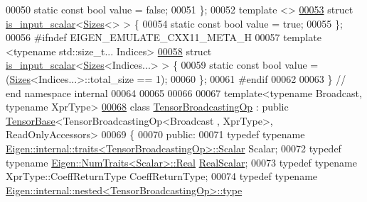 \begin{DoxyCode}
00050   \textcolor{keyword}{static} \textcolor{keyword}{const} \textcolor{keywordtype}{bool} value = \textcolor{keyword}{false};
00051 \};
00052 \textcolor{keyword}{template} <>
\hyperlink{struct_eigen_1_1internal_1_1is__input__scalar_3_01_sizes_3_4_01_4}{00053} \textcolor{keyword}{struct }\hyperlink{struct_eigen_1_1internal_1_1is__input__scalar}{is\_input\_scalar}<\hyperlink{struct_eigen_1_1_sizes}{Sizes}<> > \{
00054   \textcolor{keyword}{static} \textcolor{keyword}{const} \textcolor{keywordtype}{bool} value = \textcolor{keyword}{true};
00055 \};
00056 \textcolor{preprocessor}{#ifndef EIGEN\_EMULATE\_CXX11\_META\_H}
00057 \textcolor{keyword}{template} <\textcolor{keyword}{typename} std::size\_t... Indices>
\hyperlink{struct_eigen_1_1internal_1_1is__input__scalar_3_01_sizes_3_01_indices_8_8_8_01_4_01_4}{00058} \textcolor{keyword}{struct }\hyperlink{struct_eigen_1_1internal_1_1is__input__scalar}{is\_input\_scalar}<\hyperlink{struct_eigen_1_1_sizes}{Sizes}<Indices...> > \{
00059   \textcolor{keyword}{static} \textcolor{keyword}{const} \textcolor{keywordtype}{bool} value = (\hyperlink{struct_eigen_1_1_sizes}{Sizes}<Indices...>::total\_size == 1);
00060 \};
00061 \textcolor{preprocessor}{#endif}
00062 
00063 \}  \textcolor{comment}{// end namespace internal}
00064 
00065 
00066 
00067 \textcolor{keyword}{template}<\textcolor{keyword}{typename} Broadcast, \textcolor{keyword}{typename} XprType>
\hyperlink{class_eigen_1_1_tensor_broadcasting_op}{00068} \textcolor{keyword}{class }\hyperlink{class_eigen_1_1_tensor_broadcasting_op}{TensorBroadcastingOp} : \textcolor{keyword}{public} \hyperlink{class_eigen_1_1_tensor_base}{TensorBase}<TensorBroadcastingOp<Broadcast
      , XprType>, ReadOnlyAccessors>
00069 \{
00070   \textcolor{keyword}{public}:
00071   \textcolor{keyword}{typedef} \textcolor{keyword}{typename} \hyperlink{struct_eigen_1_1internal_1_1traits}{Eigen::internal::traits<TensorBroadcastingOp>::Scalar}
       Scalar;
00072   \textcolor{keyword}{typedef} \textcolor{keyword}{typename} \hyperlink{group___sparse_core___module}{Eigen::NumTraits<Scalar>::Real} 
      \hyperlink{group___sparse_core___module}{RealScalar};
00073   \textcolor{keyword}{typedef} \textcolor{keyword}{typename} XprType::CoeffReturnType CoeffReturnType;
00074   \textcolor{keyword}{typedef} \textcolor{keyword}{typename} \hyperlink{class_eigen_1_1internal_1_1_tensor_lazy_evaluator_writable}{Eigen::internal::nested<TensorBroadcastingOp>::type}

\end{DoxyCode}
